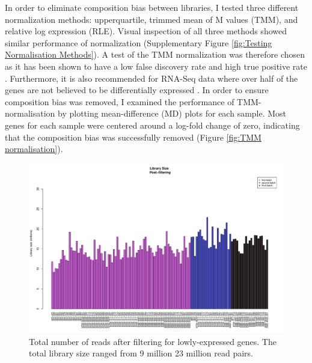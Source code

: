 \documentclass[12pt,a4paper,titlepage,twoside,openright]{book}
\begin{document}
\begin{mainmatter}
{In order to eliminate composition bias between libraries, I tested three different normalization methods: upperquartile, trimmed mean of M values (TMM), and relative log expression (RLE). Visual inspection of all three methods showed similar performance of normalization (Supplementary Figure \ref{fig:Testing Normalisation Methods}). A test of the TMM normalization was therefore chosen as it has been shown to have a low false discovery rate and high true positive rate \cite{pereira2018comparison}. Furthermore, it is also recommended for RNA-Seq data where over half of the genes are not believed to be differentially expressed \cite{chen2014edger}. In order to ensure composition bias was removed, I examined the performance of TMM-normalisation by plotting mean-difference (MD) plots for each sample. Most genes for each sample were centered around a log-fold change of zero, indicating that the composition bias was successfully removed (﻿Figure \ref{fig:TMM normalisation}).

\begin{figure}[htb!]
\centering
\includegraphics[width=\textwidth,height=\textheight,keepaspectratio]{Figures/librarySize_indoRNA_postFiltering_123Combined.pdf}
\caption{Total number of reads after filtering for lowly-expressed genes. The total library size ranged from 9 million 23 million read pairs.}
\label{fig:library size}
\end{figure}
  

}
\end{mainmatter}
\end{document}
